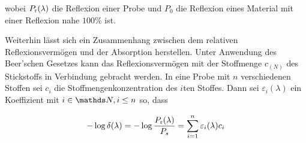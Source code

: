 		wobei $P_{\mathrm{r}}(\lambda)$ die Reflexion einer Probe und $P_0$ die Reflexion eines Material mit einer Reflexion nahe $100\%$ ist.
		
		Weiterhin lässt sich ein Zusammenhang zwischen dem relativen Reflexionsvermögen und der Absorption herstellen.
		Unter Anwendung des Beer'schen Gesetzes kann das Reflexionsvermögen mit der Stoffmenge $c_{(N)}$ des Stickstoffs in Verbindung gebracht werden.
		In eine Probe mit $n$ verschiedenen Stoffen sei $c_i$ die Stoffmengenkonzentration des $i$ten Stoffes. Dann sei $\varepsilon_i(\lambda)$ ein Koeffizient mit $i\in\SN,i\leq n$ so, dass
		
		\[
			-\log \delta(\lambda) = -\log \frac{P_{\mathrm{r}}(\lambda)}{P_s} = \sum_{i=1}^{n} \varepsilon_i(\lambda) c_i
		\]



